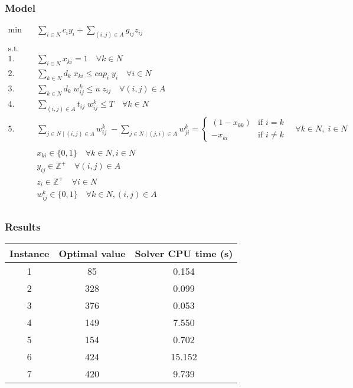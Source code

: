 \subsubsection*{Model}

\begin{align*}
    \min \quad & \sum_{i \in N} c_i y_i + \sum_{(i, j) \in A} g_{ij} z_{ij} & \\
	\\
    \text{s.t.} \quad &  \\
	1. \quad & \sum_{i \in N} x_{ki} = 1 \quad \forall k \in N  \\
	2. \quad & \sum_{k \in N} d_k \; x_{ki} \le cap_i \; y_i \quad \forall i \in N  \\
	3. \quad & \sum_{k \in N} d_k \; w_{ij}^k \le u \; z_{ij} \quad \forall (i, j) \in A \quad  \\
	4. \quad & \sum_{(i, j) \in A} t_{ij} \; w_{ij}^k \le T \quad \forall k \in N  \\
	5. \quad & \sum_{j \in N \mid (i, j) \in A} w_{ij}^k \; - \sum_{j \in N \mid (j, i) \in A} w_{ji}^k = \left\{
	\begin{array}{rl}
		(1 - x_{kk}) & \text{if } i = k  \\
		-x_{ki} & \text{if } i \ne k
	\end{array}
	\right.
	\quad \forall k \in N, \; i \in N  \\
	\\
	& x_{ki} \in \{0, 1\} \quad \forall k \in N, i \in N  \\
	& y_{ij} \in \mathbb{Z}^+ \quad \forall (i, j) \in A  \\
	& z_i \in \mathbb{Z}^+ \quad \forall i \in N  \\
	& w_{ij}^k \in \{0, 1\} \quad \forall k \in N, (i, j) \in A  \\
\end{align*}


\subsubsection*{Results}

\begin{table}[h!]
	\centering
	\begin{tabular}{|c|c|c|}
		\hline
		\textbf{Instance} & \textbf{Optimal value} & \textbf{Solver CPU time (s)} \\
		\hline
		1 & 85  & 0.154 \\
		\hline
		2 & 328 & 0.099 \\
		\hline
		3 & 376 & 0.053 \\
		\hline
		4 & 149 & 7.550 \\
		\hline
		5 & 154 & 0.702 \\
		\hline
		6 & 424 & 15.152 \\
		\hline
		7 & 420 & 9.739 \\
		\hline
	\end{tabular}
	\label{tab:instance_costs}
\end{table}
